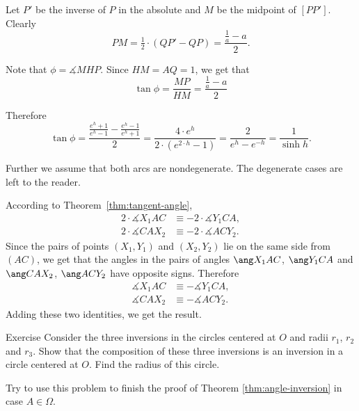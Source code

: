 {Let $P'$ be the inverse of $P$ in the absolute
and $M$ be the midpoint of $[PP']$.
Clearly 
$$PM=\tfrac12\cdot(QP'-QP)=\frac{\frac1a-a}{2}.$$

Note that $\phi=\measuredangle MHP$.
Since $HM=AQ=1$, we get that
$$\tan\phi=\frac{MP}{HM}=\frac{\frac1a-a}{2}$$


Therefore
$$\tan \phi
=\frac{\frac{e^h+1}{e^h-1}-\frac{e^h-1}{e^h+1}}2
=\frac{4\cdot e^{h}}{2\cdot( e^{2\cdot h}-1)}
=\frac{2}{e^{h}-e^{-h}}=\frac1{\sinh h}.$$
\qedsf












Further we assume that both arcs are nondegenerate.
The degenerate cases are left to the reader.

According to Theorem~\ref{thm:tangent-angle},
\begin{align*}
2\cdot \measuredangle X_1AC
&\equiv -2\cdot \measuredangle Y_1CA,
\\
2\cdot \measuredangle CAX_2
&\equiv -2\cdot \measuredangle ACY_2.
\end{align*}
Since the pairs of points $(X_1, Y_1)$ and $(X_2, Y_2)$
lie on the same side from $(AC)$,
we get that the  angles in the pairs of angles 
$\ang X_1AC$, $\ang Y_1CA$ 
and $\ang CAX_2$, $\ang ACY_2$
have opposite signs.
Therefore 
\begin{align*}
\measuredangle X_1AC
&\equiv - \measuredangle Y_1CA,
\\
 \measuredangle CAX_2
&\equiv - \measuredangle ACY_2.
\end{align*}
Adding these two identities, we get the result.
\qeds








\begin{thm}{Exercise}\label{ex:3-inverions}
Consider the three inversions
in the circles centered at $O$ and radii $r_1$, $r_2$ and $r_3$.
Show that the composition of these three inversions is an inversion in a circle centered at $O$.
Find the radius of this circle.

Try to use this problem to finish the proof of Theorem \ref{thm:angle-inversion} in case $A\in\Omega$.
\end{thm}







}
